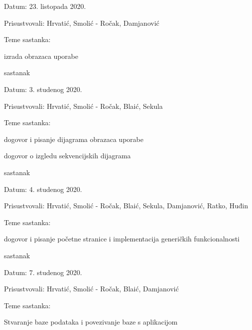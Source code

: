 \begin{packed_enum}
			\item[] \begin{packed_item}
				\item Datum: 23. listopada 2020.
				\item Prisustvovali: Hrvatić, Smolić - Ročak, Damjanović
				\item Teme sastanka:
				\begin{packed_item}
					\item  izrada obrazaca uporabe
				\end{packed_item}
			\end{packed_item}
			
			\item  sastanak
			
			\item[] \begin{packed_item}
				\item Datum: 3. studenog 2020.
				\item Prisustvovali: Hrvatić, Smolić - Ročak, Blaić, Sekula
				\item Teme sastanka:
				\begin{packed_item}
					\item  dogovor i pisanje dijagrama obrazaca uporabe
					\item  dogovor o izgledu sekvencijskih dijagrama\newline
				\end{packed_item}
			\end{packed_item}
			
			\item  sastanak
			
			\item[] \begin{packed_item}
				\item Datum: 4. studenog 2020.
				\item Prisustvovali: Hrvatić, Smolić - Ročak, Blaić, Sekula, Damjanović, Ratko, Huđin
				\item Teme sastanka:
				\begin{packed_item}
					\item  dogovor i pisanje početne stranice i implementacija generičkih funkcionalnosti
				\end{packed_item}
			\end{packed_item}
			
			\item sastanak
			
			\item[] \begin{packed_item}
				\item Datum: 7. studenog 2020.
				\item Prisustvovali: Hrvatić, Smolić - Ročak, Blaić, Damjanović
				\item Teme sastanka:
				\begin{packed_item}
					\item  Stvaranje baze podataka i povezivanje baze s aplikacijom
				\end{packed_item}
			\end{packed_item}
			

\end{packed_enum}
